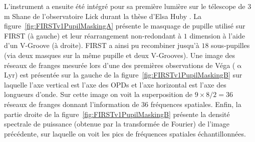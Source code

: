 L'instrument a ensuite été intégré pour sa première lumière \citep{huby2012} sur le télescope de $3 \,$m Shane de l'observatoire Lick durant la thèse d'Elsa Huby \citep{huby2013these}. La figure~\ref{fig:FIRSTv1PupilMaskingA} présente le masquage de pupille utilisé sur \ac{FIRST} (à gauche) et leur réarrangement non-redondant à $1$ dimension à l'aide d'un V-Groove (à droite). \ac{FIRST} a ainsi pu recombiner jusqu'à $18$ sous-pupilles (via deux masques sur la même pupille et deux V-Grooves). Une image des réseaux de franges mesurée lors d'une des premières observations de Véga ($\upalpha$ Lyr) est présentée sur la gauche de la figure~\ref{fig:FIRSTv1PupilMaskingB} sur laquelle l'axe vertical est l'axe des \ac{OPD}s et l'axe horizontal est l'axe des longueurs d'onde. Sur cette image on voit la superposition de $9 \times 8 / 2 = 36$ réseaux de franges donnant l'information de $36$ fréquences spatiales. Enfin, la partie droite de la figure~\ref{fig:FIRSTv1PupilMaskingB} présente la densité spectrale de puissance (obtenue par la transformée de Fourier) de l'image précédente, sur laquelle on voit les pics de fréquences spatiales échantillonnées.

